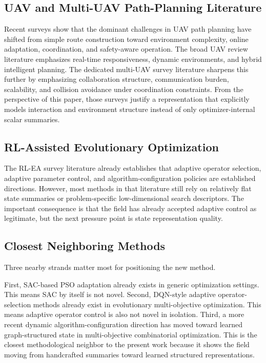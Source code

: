 \documentclass[a4paper,fleqn]{cas-sc}
\begin{document}
\subsection{UAV and Multi-UAV Path-Planning Literature}

Recent surveys show that the dominant challenges in UAV path planning have shifted from simple route construction toward environment complexity, online adaptation, coordination, and safety-aware operation. The broad UAV review literature emphasizes real-time responsiveness, dynamic environments, and hybrid intelligent planning. The dedicated multi-UAV survey literature sharpens this further by emphasizing collaboration structure, communication burden, scalability, and collision avoidance under coordination constraints. From the perspective of this paper, those surveys justify a representation that explicitly models interaction and environment structure instead of only optimizer-internal scalar summaries.

\subsection{RL-Assisted Evolutionary Optimization}

The RL-EA survey literature already establishes that adaptive operator selection, adaptive parameter control, and algorithm-configuration policies are established directions. However, most methods in that literature still rely on relatively flat state summaries or problem-specific low-dimensional search descriptors. The important consequence is that the field has already accepted adaptive control as legitimate, but the next pressure point is state representation quality.

\subsection{Closest Neighboring Methods}

Three nearby strands matter most for positioning the new method.

First, SAC-based PSO adaptation already exists in generic optimization settings. This means SAC by itself is not novel. Second, DQN-style adaptive operator-selection methods already exist in evolutionary multi-objective optimization. This means adaptive operator control is also not novel in isolation. Third, a more recent dynamic algorithm-configuration direction has moved toward learned graph-structured state in multi-objective combinatorial optimization. This is the closest methodological neighbor to the present work because it shows the field moving from handcrafted summaries toward learned structured representations.
\end{document}
